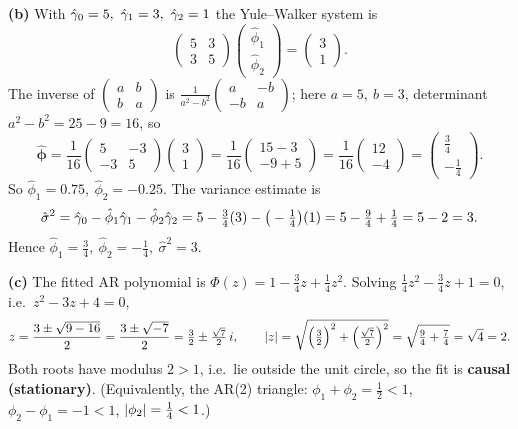 \documentclass[11pt]{article}
\begin{document}
\textbf{(b)} With $\hat\acvs_0=5,\ \hat\acvs_1=3,\ \hat\acvs_2=1$ the
Yule--Walker system is
\[
\begin{pmatrix}5 & 3\\ 3 & 5\end{pmatrix}
\begin{pmatrix}\hat\phi_1\\ \hat\phi_2\end{pmatrix}
=\begin{pmatrix}3\\ 1\end{pmatrix}.
\]
The inverse of $\left(\begin{smallmatrix}a&b\\ b&a\end{smallmatrix}\right)$ is
$\tfrac{1}{a^2-b^2}\left(\begin{smallmatrix}a&-b\\ -b&a\end{smallmatrix}\right)$;
here $a=5,\ b=3$, determinant $a^2-b^2=25-9=16$, so
\[
\hat{\boldsymbol\phi}
=\frac{1}{16}\begin{pmatrix}5 & -3\\ -3 & 5\end{pmatrix}\begin{pmatrix}3\\ 1\end{pmatrix}
=\frac{1}{16}\begin{pmatrix}15-3\\ -9+5\end{pmatrix}
=\frac{1}{16}\begin{pmatrix}12\\ -4\end{pmatrix}
=\begin{pmatrix}\tfrac34\\[2pt] -\tfrac14\end{pmatrix}.
\]
So $\hat\phi_1=0.75,\ \hat\phi_2=-0.25$. The variance estimate is
\[
\hat\sigma^2=\hat{\gamma}_0-\hat\phi_1\hat{\gamma}_1-\hat\phi_2\hat{\gamma}_2
=5-\tfrac34(3)-\big(-\tfrac14\big)(1)
=5-\tfrac94+\tfrac14=5-2=3 .
\]
Hence $\hat\phi_1=\tfrac34,\ \hat\phi_2=-\tfrac14,\ \hat\sigma^2=3$.

\textbf{(c)} The fitted AR polynomial is
$\Phi(z)=1-\tfrac34 z+\tfrac14 z^2$. Solving $\tfrac14 z^2-\tfrac34 z+1=0$,
i.e.\ $z^2-3z+4=0$,
\[
z=\frac{3\pm\sqrt{9-16}}{2}=\frac{3\pm\sqrt{-7}}{2}=\tfrac32\pm\tfrac{\sqrt7}{2}\,i,
\qquad
\left\lvert z \right\rvert=\sqrt{\Big(\tfrac32\Big)^2+\Big(\tfrac{\sqrt7}{2}\Big)^2}=\sqrt{\tfrac94+\tfrac74}=\sqrt4=2 .
\]
Both roots have modulus $2>1$, i.e.\ lie outside the unit circle, so the fit is
\textbf{causal (stationary)}. (Equivalently, the AR(2) triangle:
$\phi_1+\phi_2=\tfrac12<1$, $\phi_2-\phi_1=-1<1$, $\left\lvert \phi_2 \right\rvert=\tfrac14<1$.)
\end{document}
